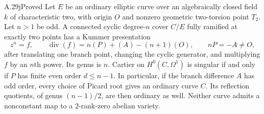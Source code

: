 \begin{claim}{A.29j}{Proved}
Let $E$ be an ordinary elliptic curve over an algebraically
closed field $k$ of characteristic two, with origin $O$ and
nonzero geometric two-torsion point $T_2$. Let $n>1$ be odd.
A connected cyclic degree-$n$ cover $C/E$ fully ramified
at exactly two points has a Kummer presentation
\[
 z^n=f,\qquad
 \operatorname{div}(f)=n(P)+(A)-(n+1)(O),\qquad nP=-A\ne O,
                                                               \tag{A.50}
\]
after translating one branch point, changing the cyclic
generator, and multiplying $f$ by an $n$th power.
Its genus is $n$. Cartier on $H^0(C,\Omega^1)$ is singular
if and only if $P$ has finite even order $d\le n-1$.
In particular, if the branch difference $A$ has odd order,
every choice of Picard root gives an ordinary curve $C$.
Its reflection quotients, of genus $(n-1)/2$, are then
ordinary as well. Neither curve admits a nonconstant map
to a $2$-rank-zero abelian variety.
\end{claim}

